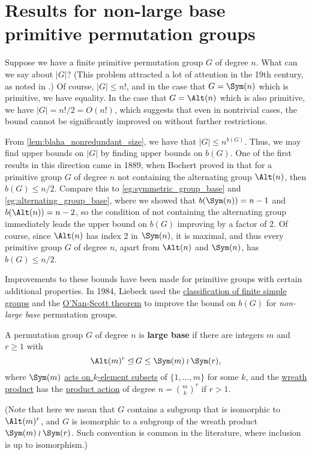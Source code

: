 \section{Results for non-large base primitive permutation groups}

Suppose we have a finite primitive permutation group $G$ of degree $n$. What can we say about $|G|$? (This problem attracted a lot of attention in the 19th century, as noted in \cite{moscatiello_roney-dougal2021}.) Of course, $|G| \leq n!$, and in the case that $G = \Sym(n)$ which is primitive, we have equality. In the case that $G = \Alt(n)$ which is also primitive, we have $|G| = n!/2 = O(n!)$, which suggests that even in nontrivial cases, the bound cannot be significantly improved on without further restrictions.

From \autoref{lem:blaha_nonredundant_size}, we have that $|G| \leq n^{b(G)}$. Thus, we may find upper bounds on $|G|$ by finding upper bounds on $b(G)$. One of the first results in this direction came in 1889, when Bochert proved in \cite{bochert1889} that for a primitive group $G$ of degree $n$ not containing the alternating group $\Alt(n)$, then $b(G) \leq n/2$. Compare this to \autoref{eg:symmetric_group_base} and \autoref{eg:alternating_group_base}, where we showed that $b(\Sym(n)) = n-1$ and $b(\Alt(n)) = n-2$, so the condition of not containing the alternating group immediately leads the upper bound on $b(G)$ improving by a factor of 2. Of course, since $\Alt(n)$ has index 2 in $\Sym(n)$, it is maximal, and thus every primitive group $G$ of degree $n$, apart from $\Alt(n)$ and $\Sym(n)$, has $b(G) \leq n/2$.

Improvements to these bounds have been made for primitive groups with certain additional properties. In 1984, Liebeck used the \hyperref[thm:cfsg]{classification of finite simple groups} and the \hyperref[thm:onan-scott]{O'Nan-Scott theorem} to improve the bound on $b(G)$ for \textit{non-large base} permutation groups.

\begin{definition}\label{def:large_base}
    A permutation group $G$ of degree $n$ is \textbf{large base} if there are integers $m$ and $r \geq 1$ with
    $$\Alt(m)^r \unlhd G \leq \Sym(m) \wr \Sym(r),$$
    where $\Sym(m)$ \hyperref[eg:product_action_Sm_subsets]{acts on $k$-element subsets} of $\{1,\dotsc,m\}$ for some $k$, and the \hyperref[def:wreath_product]{wreath product} has the \hyperref[def:product_action]{product action} of degree $n = \binom{m}{k}^r$ if $r > 1$.

    (Note that here we mean that $G$ contains a subgroup that is isomorphic to $\Alt(m)^r$, and $G$ is isomorphic to a subgroup of the wreath product $\Sym(m) \wr \Sym(r)$. Such convention is common in the literature, where inclusion is up to isomorphism.)
\end{definition}

